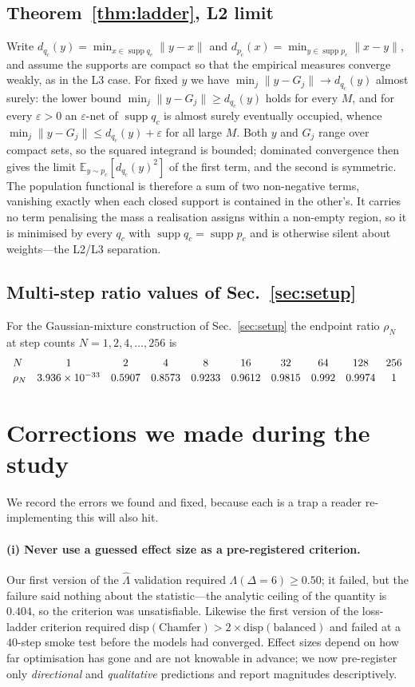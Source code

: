 \documentclass{article}
\theoremstyle{plain}
\newcommand{\cL}{\hat\Lambda}
\newcommand{\Eop}{\mathbb{E}}
\newcommand{\supp}{\operatorname{supp}}
\begin{document}
\subsection{Theorem~\ref{thm:ladder}, L2 limit}
Write $d_{q_c}(y)=\min_{x\in\supp q_c}\|y-x\|$ and $d_{p_c}(x)=\min_{y\in\supp p_c}\|x-y\|$,
and assume the supports are compact so that the empirical measures converge weakly, as in
the L3 case. For fixed $y$ we have $\min_j\|y-G_j\|\to d_{q_c}(y)$ almost surely: the lower
bound $\min_j\|y-G_j\|\ge d_{q_c}(y)$ holds for every $M$, and for every $\varepsilon>0$ an
$\varepsilon$-net of $\supp q_c$ is almost surely eventually occupied, whence
$\min_j\|y-G_j\|\le d_{q_c}(y)+\varepsilon$ for all large $M$. Both $y$ and $G_j$ range
over compact sets, so the squared integrand is bounded; dominated convergence then gives
the limit $\Eop_{y\sim p_c}[d_{q_c}(y)^2]$ of the first term, and the second is symmetric.
The population functional is therefore a sum of two non-negative terms, vanishing exactly
when each closed support is contained in the other's. It carries no term penalising the
mass a realisation assigns within a non-empty region, so it is minimised by every $q_c$ with
$\supp q_c=\supp p_c$ and is otherwise silent about weights---the L2/L3 separation.

\subsection{Multi-step ratio values of Sec.~\ref{sec:setup}}
For the Gaussian-mixture construction of Sec.~\ref{sec:setup} the endpoint ratio
$\rho_N$ at step counts $N=1,2,4,\dots,256$ is
\[
\begin{array}{lccccccccc}
N & 1 & 2 & 4 & 8 & 16 & 32 & 64 & 128 & 256\\[2pt]
\rho_N & 3.936\times 10^{-33} & 0.5907 & 0.8573 & 0.9233 & 0.9612 &
0.9815 & 0.992 & 0.9974 & 1
\end{array}
\]

\section{Corrections we made during the study}
\label{app:corrections}
We record the errors we found and fixed, because each is a trap a reader
re-implementing this will also hit.

\paragraph{(i) Never use a guessed effect size as a pre-registered criterion.}
Our first version of the $\cL$ validation required $\Lambda(\Delta=6)\ge0.50$; it
failed, but the failure said nothing about the statistic---the analytic ceiling of the
quantity is $0.404$, so the criterion was unsatisfiable. Likewise the first version of
the loss-ladder criterion required $\mathrm{disp}(\text{Chamfer})>2\times
\mathrm{disp}(\text{balanced})$ and failed at a $40$-step smoke test before the models
had converged. Effect sizes depend on how far optimisation has gone and are not
knowable in advance; we now pre-register only \emph{directional} and \emph{qualitative}
predictions and report magnitudes descriptively.
\end{document}
